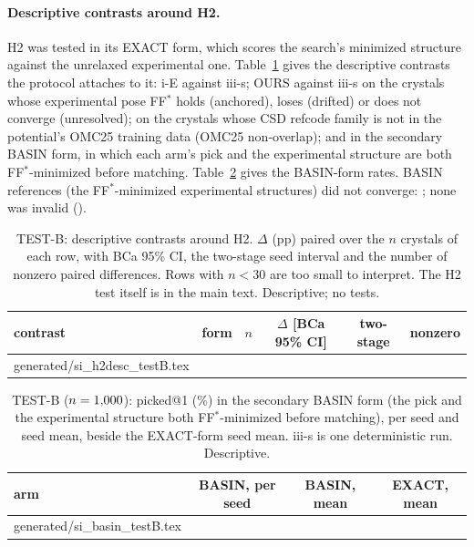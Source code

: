 \documentclass[journal=acsodf,manuscript=article]{achemso}
\makeatletter
\newcommand{\inputrows}[1]{\@@input #1 }
\makeatother
\begin{document}
\paragraph{Descriptive contrasts around H2.} H2 was tested in its EXACT form, which scores the
search's minimized structure against the unrelaxed experimental one. Table~\ref{tab:si_h2desc}
gives the descriptive contrasts the protocol attaches to it: i-E against iii-s; OURS against
iii-s on the crystals whose experimental pose FF$^\ast$ holds (anchored), loses (drifted) or does
not converge (unresolved); on the crystals whose CSD refcode family is not in the potential's
OMC25 training data (OMC25 non-overlap); and in the secondary BASIN form, in which each arm's pick and the experimental
structure are both FF$^\ast$-minimized before matching. Table~\ref{tab:si_basin} gives the
BASIN-form rates. \svBasinUnconvN{} BASIN references (the FF$^\ast$-minimized experimental
structures) did not converge: \svBasinUnconv; none was invalid (\svBasinInvalid).

\begin{table}[htbp]
\caption{TEST-B: descriptive contrasts around H2. $\Delta$ (pp) paired over the $n$ crystals of
each row, with BCa 95\% CI, the two-stage seed interval and the number of nonzero paired
differences. Rows with $n<30$ are too small to interpret. The H2 test itself is in the main
text. Descriptive; no tests.}
\label{tab:si_h2desc}
\centering
\footnotesize
\setlength{\tabcolsep}{3pt}
\begin{tabular}{@{}p{5.0cm}lrccr@{}}
\toprule
contrast & form & $n$ & $\Delta$ [BCa 95\% CI] & two-stage & nonzero \\
\midrule
\inputrows{generated/si_h2desc_testB.tex}
\bottomrule
\end{tabular}
\end{table}

\begin{table}[htbp]
\caption{TEST-B ($n=1{,}000$): picked@1 (\%) in the secondary BASIN form (the pick and the
experimental structure both FF$^\ast$-minimized before matching), per seed and seed mean, beside
the EXACT-form seed mean. iii-s is one deterministic run. Descriptive.}
\label{tab:si_basin}
\centering
\small
\begin{tabular}{@{}lccc@{}}
\toprule
arm & BASIN, per seed & BASIN, mean & EXACT, mean \\
\midrule
\inputrows{generated/si_basin_testB.tex}
\bottomrule
\end{tabular}
\end{table}
\end{document}
